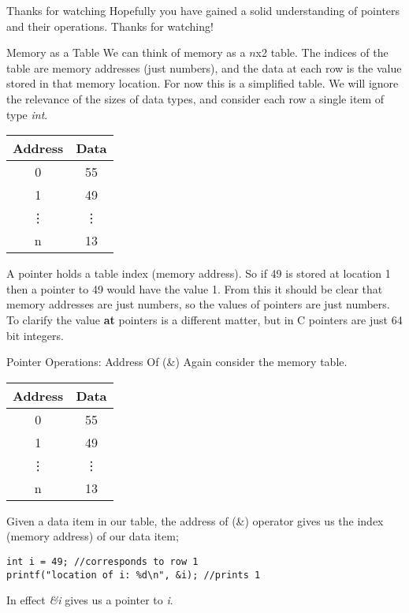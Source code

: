\documentclass[10pt]{beamer}
\begin{document}
\begin{frame}{Thanks for watching}
	Hopefully you have gained a solid understanding of pointers and their operations. Thanks for watching!
\end{frame}

\iffalse
\begin{frame}{Memory as a Table}
	We can think of memory as a $n$x2 table. The indices of the table are memory addresses (just numbers), and the data at each row is the value stored in that memory location. For now this is a simplified table. We will ignore the relevance of the sizes of data types, and consider each row a single item of type {\it int}.

	\begin{tabular}{|c|c|}
		\hline
		Address & Data\\
		\hline
		0 & 55 \\
		\hline
		1 & 49 \\
		\hline
		\vdots & \vdots \\
		\hline
		n & 13\\
		\hline
	\end{tabular}

A pointer holds a table index (memory address). So if 49 is stored at location 1 then a pointer to 49 would have the value 1. From this it should be clear that memory addresses are just numbers, so the values of pointers are just numbers. To clarify the value {\bf at} pointers is a different matter, but in C pointers are just 64 bit integers.
\end{frame}

\begin{frame}[fragile]{Pointer Operations: Address Of (\&)}
	Again consider the memory table.

	\begin{tabular}{|c|c|}
		\hline
		Address & Data\\
		\hline
		0 & 55 \\
		\hline
		1 & 49 \\
		\hline
		\vdots & \vdots \\
		\hline
		n & 13\\
		\hline
	\end{tabular}

	Given a data item in our table, the address of (\&) operator gives us the index (memory address) of our data item;

\begin{verbatim}
int i = 49; //corresponds to row 1
printf("location of i: %d\n", &i); //prints 1
\end{verbatim}
In effect {\it \&i} gives us a pointer to {\it i}.

\end{frame}
\end{document}
